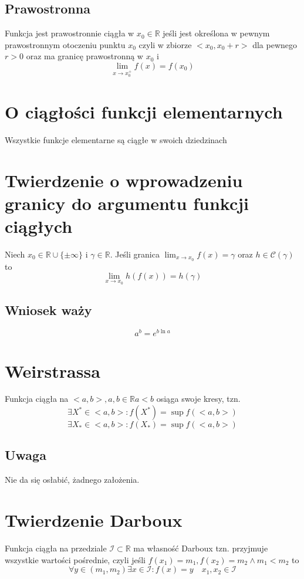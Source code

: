 \documentclass[11pt]{article}
\begin{document}
\subsection{Prawostronna}
Funkcja jest prawostronnie ciągła w $x_0 \in \mathbb{R}$ jeśli jest określona w pewnym prawostronnym otoczeniu punktu $x_0$ czyli w zbiorze $<x_0,x_0 + r>$ dla pewnego $r >0$ oraz ma granicę prawostronną w $x_0$ i $$\lim_{x \to x_0^+} f(x) = f(x_0)$$
\section{O ciągłości funkcji elementarnych}
Wszystkie funkcje elementarne są ciągłe w swoich dziedzinach

\section{Twierdzenie o wprowadzeniu granicy do argumentu funkcji ciągłych}
Niech $x_0 \in \mathbb{R} \cup \{ \pm \infty \}$ i $\gamma \in \mathbb{R}$.
 Jeśli granica $\lim_{x \to x_0}{f(x)} = \gamma$ oraz $h \in \mathcal{C}(\gamma)$ to $$ \lim_{x \to x_0}{h(f(x))} = h(\gamma)$$

\subsection{Wniosek waży}
$$ a^b = e^{b \ln{a}}$$

\section{Weirstrassa}
Funkcja ciągła na $<a,b> , a,b \in \mathbb{R} a < b$ osiąga swoje kresy, tzn. 
$$ \exists X^* \in <a,b> : f(X^*) = \sup{f(<a,b>)}$$
$$ \exists X_* \in <a,b> : f(X_*) = \sup{f(<a,b>)}$$
\subsection{Uwaga}
Nie da się osłabić, żadnego założenia.

\section{Twierdzenie Darboux}
Funkcja ciągła na przedziale $\mathcal{I} \subset \mathbb{R}$ ma własność Darboux tzn. przyjmuje wszystkie wartości pośrednie, czyli jeśli
$f(x_1) = m_1 , f(x_2) = m_2 \wedge m_1 < m_2$ to $$ \forall y \in (m_1,m_2) \exists x \in \mathcal{I} : f(x) = y \quad x_1,x_2 \in \mathcal{I}$$ 
\end{document}
